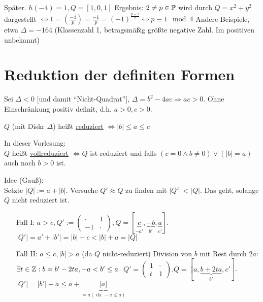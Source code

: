 \documentclass[a4paper,twoside,DIV15,BCOR12mm]{scrbook}
\begin{document}
Später. $h(-4) = 1, Q = [1,0,1]$
Ergebnis: $2 \not= p \in \mathbb{P}$ wird durch $Q = x^2 + y^2$ dargestellt $\Leftrightarrow 1 = (\frac{-4}{p}) = \frac{-1}{p} = (-1)^{\frac{p-1}{2}} \Leftrightarrow p \equiv 1 \mod 4$
Andere Beispiele, etwa $\Delta = -164$ (Klassenzahl 1, betragsmäßig größte negative Zahl. Im positiven unbekannt)

\section{Reduktion der definiten Formen}

Sei $\Delta < 0$ [und damit "`Nicht-Quadrat"'], $\Delta = b^2 - 4ac \Rightarrow ac > 0$. Ohne Einschränkung positiv definit, d.h. $a > 0, c > 0$.
\begin{definition}[Gauß]
$Q$ (mit Diskr $\Delta$) heißt \underline{reduziert} $\Leftrightarrow |b| \le a \le c$
\end{definition}

In dieser Vorlesung:\\
$Q$ heißt \underline{vollreduziert} $\Leftrightarrow Q$ ist reduziert und falls $(c = 0 \wedge b \not= 0) \vee (|b| = a)$ auch noch $b > 0$ ist.

Idee (Gauß):\\
Setzte $|Q| := a + |b|$. Versuche $Q' \approx Q$ zu finden mit $|Q'| < |Q|$. Das geht, solange $Q$ nicht reduziert ist.
\begin{itemize}
\item[Fall I:] $a > c, Q' := \begin{pmatrix}\cdot & 1 \\ -1 & \cdot\end{pmatrix}, Q = [\underbrace{c}_{-a'}, \underbrace{-b}_{b'}, \underbrace{a}_{c'}]$. $|Q'| = a' + |b'| = |b| + c < |b| + a = |Q|$
\item[Fall II:] $a \le c, |b| > a$ (da $Q$ nicht-reduziert) Division von $b$ mit Rest durch $2a$: $\exists t \in \mathbb{Z}: b = b' - 2ta, -a < b' \le a$. $Q' = \begin{pmatrix}1 & \cdot \\ t & 1\end{pmatrix}.Q = [a, \underbrace{b + 2ta}_{b'}, c']$. $|Q'| = |b'| + a \le a + \underbrace{|a|}_{= a (\text{ da }-a \le a)}$
\end{itemize}
\end{document}

